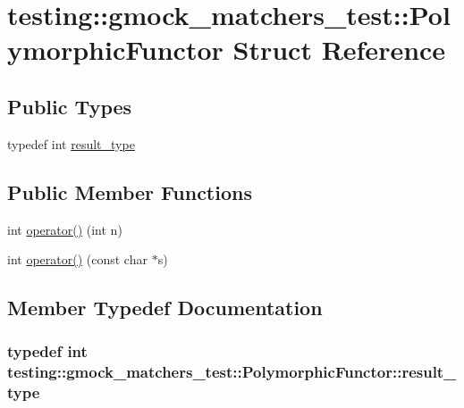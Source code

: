 \hypertarget{structtesting_1_1gmock__matchers__test_1_1_polymorphic_functor}{}\section{testing\+:\+:gmock\+\_\+matchers\+\_\+test\+:\+:Polymorphic\+Functor Struct Reference}
\label{structtesting_1_1gmock__matchers__test_1_1_polymorphic_functor}
\subsection*{Public Types}
\begin{DoxyCompactItemize}
\item 
typedef int \hyperlink{structtesting_1_1gmock__matchers__test_1_1_polymorphic_functor_ae2b921ecae158b5eaa11a29ac6fe0cf3}{result\+\_\+type}
\end{DoxyCompactItemize}
\subsection*{Public Member Functions}
\begin{DoxyCompactItemize}
\item 
int \hyperlink{structtesting_1_1gmock__matchers__test_1_1_polymorphic_functor_a2fb8b012acd2ccd52788231036877c98}{operator()} (int n)
\item 
int \hyperlink{structtesting_1_1gmock__matchers__test_1_1_polymorphic_functor_aee4d200c7f85ce4d8048d1798a511002}{operator()} (const char $\ast$s)
\end{DoxyCompactItemize}


\subsection{Member Typedef Documentation}
\subsubsection[{\texorpdfstring{result\+\_\+type}{result_type}}]{\setlength{\rightskip}{0pt plus 5cm}typedef int {\bf testing\+::gmock\+\_\+matchers\+\_\+test\+::\+Polymorphic\+Functor\+::result\+\_\+type}}\hypertarget{structtesting_1_1gmock__matchers__test_1_1_polymorphic_functor_ae2b921ecae158b5eaa11a29ac6fe0cf3}{}\label{structtesting_1_1gmock__matchers__test_1_1_polymorphic_functor_ae2b921ecae158b5eaa11a29ac6fe0cf3}


